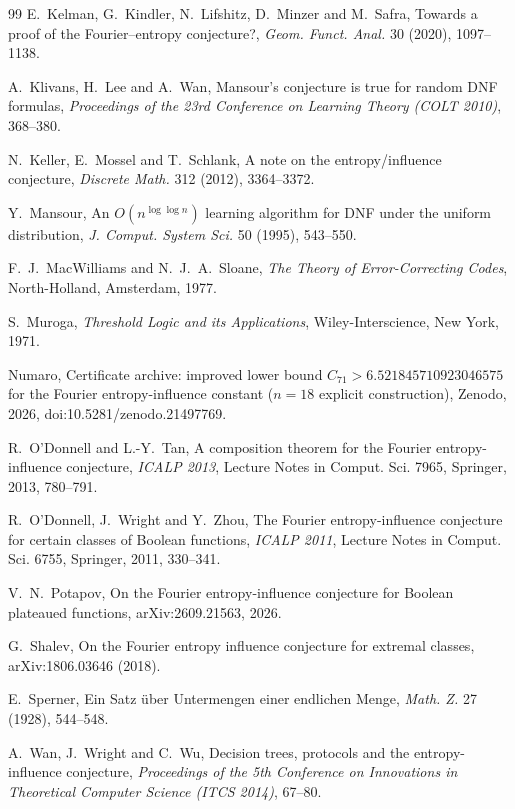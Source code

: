 \documentclass[11pt]{amsart}
\theoremstyle{definition}
\theoremstyle{remark}
\begin{document}
\begin{thebibliography}{99}
 E.~Kelman, G.~Kindler, N.~Lifshitz, D.~Minzer and M.~Safra, Towards a proof of the
Fourier--entropy conjecture?, \emph{Geom. Funct. Anal.} 30 (2020), 1097--1138.

 A.~Klivans, H.~Lee and A.~Wan, Mansour's conjecture is true for random DNF formulas,
\emph{Proceedings of the 23rd Conference on Learning Theory (COLT 2010)}, 368--380.

 N.~Keller, E.~Mossel and T.~Schlank, A note on the entropy/influence conjecture, \emph{Discrete
Math.} 312 (2012), 3364--3372.

 Y.~Mansour, An $O(n^{\log\log n})$ learning algorithm for DNF under the uniform distribution,
\emph{J. Comput. System Sci.} 50 (1995), 543--550.

 F.~J.~MacWilliams and N.~J.~A.~Sloane, \emph{The Theory of Error-Correcting Codes}, North-Holland,
Amsterdam, 1977.

 S.~Muroga, \emph{Threshold Logic and its Applications}, Wiley-Interscience, New York, 1971.

 Numaro, Certificate archive: improved lower bound $C_{71}>6.521845710923046575$ for the Fourier
entropy-influence constant ($n=18$ explicit construction), Zenodo, 2026, doi:10.5281/zenodo.21497769.

 R.~O'Donnell and L.-Y.~Tan, A composition theorem for the Fourier entropy-influence conjecture,
\emph{ICALP 2013}, Lecture Notes in Comput. Sci. 7965, Springer, 2013, 780--791.

 R.~O'Donnell, J.~Wright and Y.~Zhou, The Fourier entropy-influence conjecture for certain classes
of Boolean functions, \emph{ICALP 2011}, Lecture Notes in Comput. Sci. 6755, Springer, 2011, 330--341.

 V.~N.~Potapov, On the Fourier entropy-influence conjecture for Boolean plateaued functions,
arXiv:2609.21563, 2026.

 G.~Shalev, On the Fourier entropy influence conjecture for extremal classes, arXiv:1806.03646
(2018).

 E.~Sperner, Ein Satz \"uber Untermengen einer endlichen Menge, \emph{Math. Z.} 27 (1928),
544--548.

 A.~Wan, J.~Wright and C.~Wu, Decision trees, protocols and the entropy-influence conjecture,
\emph{Proceedings of the 5th Conference on Innovations in Theoretical Computer Science (ITCS 2014)}, 67--80.

\end{thebibliography}
\end{document}
